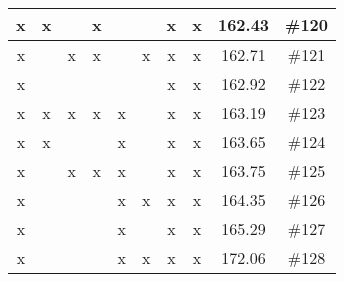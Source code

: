 \begin{center}
\begin{longtable}{|c|c|c|c|c|c|c|c|c|c|}
 x &  x &  &  x &  &  &  x &  x & 162.43 & \#120 \\ \hline
 x &  &  x &  x &  &  x &  x &  x & 162.71 & \#121 \\ \hline
 x &  &  &  &  &  &  x &  x & 162.92 & \#122 \\ \hline
 x &  x &  x &  x &  x &  &  x &  x & 163.19 & \#123 \\ \hline
 x &  x &  &  &  x &  &  x &  x & 163.65 & \#124 \\ \hline
 x &  &  x &  x &  x &  &  x &  x & 163.75 & \#125 \\ \hline
 x &  &  &  &  x &  x &  x &  x & 164.35 & \#126 \\ \hline
 x &  &  &  &  x &  &  x &  x & 165.29 & \#127 \\ \hline
 x &  &  &  &  x &  x &  x &  x & 172.06 & \#128 \\ \hline
\end{longtable}
\label{table:windProdInputParams}
\end{center}
\normalsize